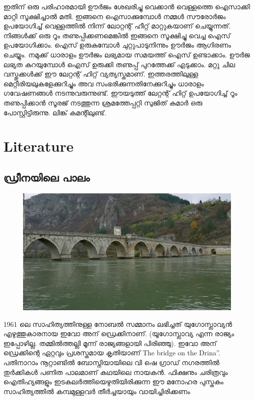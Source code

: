 \documentclass[10pt,a4paper]{report}
\begin{document}
   ഇതിന് ഒരു പരിഹാരമായി ഊർജം ശേഖരിച്ചു വെക്കാൻ വെള്ളത്തെ ഐസാക്കി മാറ്റി സൂക്ഷിച്ചാൽ മതി. ഇങ്ങനെ ഐസാക്കുമ്പോൾ നമ്മൾ സൗരോർജം ഉപയോഗിച്ച് വെള്ളത്തിൽ നിന്ന് ലോറ്റന്റ് ഹീറ്റ് മാറ്റുകയാണ് ചെയ്യുന്നത്. നിങ്ങൾക്ക് ഒരു റൂം തണുപ്പിക്കണമെങ്കിൽ ഇങ്ങനെ സൂക്ഷിച്ചു വെച്ച ഐസ് ഉപയോഗിക്കാം. ഐസ് ഉരുകുമ്പോൾ ചുറ്റുപാടുനിന്നും ഊർജം ആഗിരണം ചെയ്യും. നമുക്ക് ധാരാളം ഊർജം ലഭ്യമായ സമയത്ത് ഐസ് ഉണ്ടാക്കാം. ഊർജ ലഭ്യത കുറയുമ്പോൾ ഐസ് ഉരുക്കി തണുപ്പ് പുറത്തേക്ക് എടുക്കാം. മറ്റു ചില വസ്തുക്കൾക്ക് ഈ ലേറ്റന്റ് ഹിറ്റ് വ്യത്യസ്തമാണ്. ഇത്തരത്തിലുള്ള മെറ്റീരിയലുകളേക്കുറിച്ചും അവ സംഭരിക്കുന്നതിനേക്കുറിച്ചും ധാരാളം ഗവേഷണങ്ങൾ നടന്നുവരുന്നുണ്ട്. ഈയടുത്ത് ലേറ്റന്റ് ഹിറ്റ് ഉപയോഗിച്ച് റൂം തണുപ്പിക്കാൻ സൂരജ് നടത്തുന്ന ശ്രമത്തേപ്പറ്റി സുജിത് കുമാർ ഒരു പോസ്റ്റിട്ടിരുന്നു. ലിങ്ക് കമന്റിലുണ്ട്.
\chapter{Literature}

\section{ഡ്രീനയിലെ പാലം}
 
 
  \begin{figure}[H]
  \center
\includegraphics[scale=.25]{images/drina}
\label{drina}
\caption{   }
\end{figure}
1961 ലെ സാഹിത്യത്തിനുള്ള നോബൽ സമ്മാനം ലഭിച്ചത് യുഗോസ്ലാവ്യൻ എഴുത്തുകാരനായ ഇവോ അന് ഡ്രെക്കിനാണ്. (യൂഗോസ്ലാവ്യ എന്ന രാജ്യം ഇപ്പോഴില്ല. തമ്മിൽത്തല്ലി മൂന്ന് രാജ്യങ്ങളായി പിരിഞ്ഞു). ഇവോ അന് ഡ്രെക്കിന്റെ ഏറ്റവും പ്രശസ്തമായ കൃതിയാണ് The bridge on the Drina”. പതിനാറാം നൂറ്റാണ്ടിൽ ബോസ്നിയായിലെ വി ഷെ ഗ്രാഡ് നഗരത്തിൽ തുർക്കികൾ പണിത പാലമാണ് കഥയിലെ നായകൻ. ഫിക്ഷനും ചരിത്രവും ഐതിഹ്യങ്ങളും ഇടകലർത്തിയെഴുതിയിരിക്കുന്ന ഈ മനോഹര പുസ്തകം സാഹിത്യത്തിൽ കമ്പമുള്ളവർ തീർച്ചയായും വായിച്ചിരിക്കണം‌
\end{document}
